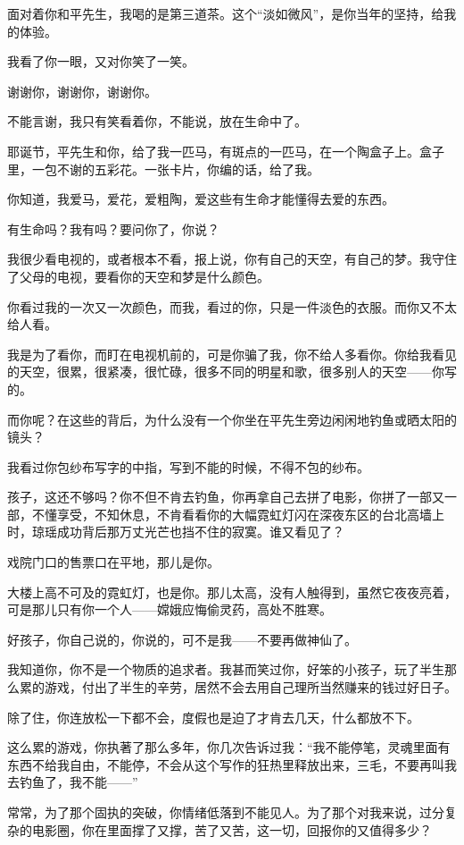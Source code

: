 \par 面对着你和平先生，我喝的是第三道茶。这个“淡如微风”，是你当年的坚持，给我的体验。
\par 我看了你一眼，又对你笑了一笑。
\par 谢谢你，谢谢你，谢谢你。
\par 不能言谢，我只有笑看着你，不能说，放在生命中了。
\par 耶诞节，平先生和你，给了我一匹马，有斑点的一匹马，在一个陶盒子上。盒子里，一包不谢的五彩花。一张卡片，你编的话，给了我。
\par 你知道，我爱马，爱花，爱粗陶，爱这些有生命才能懂得去爱的东西。
\par 有生命吗？我有吗？要问你了，你说？
\par 我很少看电视的，或者根本不看，报上说，你有自己的天空，有自己的梦。我守住了父母的电视，要看你的天空和梦是什么颜色。
\par 你看过我的一次又一次颜色，而我，看过的你，只是一件淡色的衣服。而你又不太给人看。
\par 我是为了看你，而盯在电视机前的，可是你骗了我，你不给人多看你。你给我看见的天空，很累，很紧凑，很忙碌，很多不同的明星和歌，很多别人的天空——你写的。
\par 而你呢？在这些的背后，为什么没有一个你坐在平先生旁边闲闲地钓鱼或晒太阳的镜头？
\par 我看过你包纱布写字的中指，写到不能的时候，不得不包的纱布。
\par 孩子，这还不够吗？你不但不肯去钓鱼，你再拿自己去拼了电影，你拼了一部又一部，不懂享受，不知休息，不肯看看你的大幅霓虹灯闪在深夜东区的台北高墙上时，琼瑶成功背后那万丈光芒也挡不住的寂寞。谁又看见了？
\par 戏院门口的售票口在平地，那儿是你。
\par 大楼上高不可及的霓虹灯，也是你。那儿太高，没有人触得到，虽然它夜夜亮着，可是那儿只有你一个人——嫦娥应悔偷灵药，高处不胜寒。
\par 好孩子，你自己说的，你说的，可不是我——不要再做神仙了。
\par 我知道你，你不是一个物质的追求者。我甚而笑过你，好笨的小孩子，玩了半生那么累的游戏，付出了半生的辛劳，居然不会去用自己理所当然赚来的钱过好日子。
\par 除了住，你连放松一下都不会，度假也是迫了才肯去几天，什么都放不下。
\par 这么累的游戏，你执著了那么多年，你几次告诉过我：“我不能停笔，灵魂里面有东西不给我自由，不能停，不会从这个写作的狂热里释放出来，三毛，不要再叫我去钓鱼了，我不能——”
\par 常常，为了那个固执的突破，你情绪低落到不能见人。为了那个对我来说，过分复杂的电影圈，你在里面撑了又撑，苦了又苦，这一切，回报你的又值得多少？
